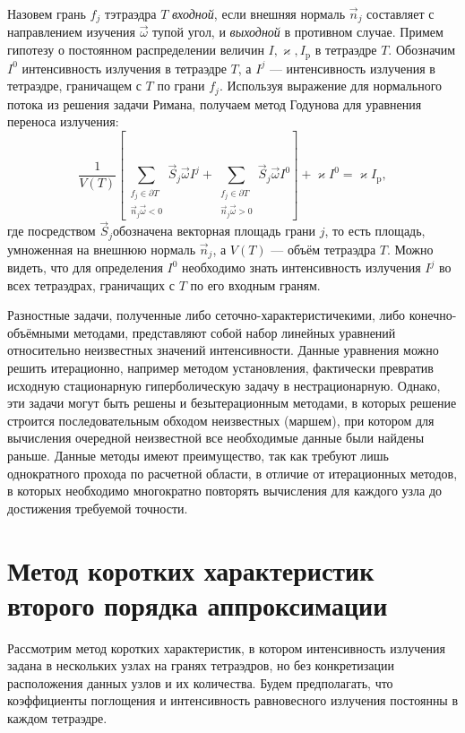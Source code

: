 Назовем грань $f_j$ тэтраэдра $T$ \emph{входной}, если внешняя нормаль $\vec n_j$ составляет с направлением изучения $\vec \omega$ тупой угол, и \emph{выходной} в противном случае.
Примем гипотезу о постоянном распределении величин $I, \varkappa, I_{\text{p}}$ в тетраэдре $T$. Обозначим $I^0$ интенсивность излучения в тетраэдре $T$, а $I^j$ --- интенсивность излучения в тетраэдре, граничащем с $T$ по грани $f_j$. Используя выражение для нормального потока из решения задачи Римана, получаем метод Годунова для уравнения переноса излучения:
\begin{equation}
\frac{1}{V(T)}\left[
\sum_{\substack{f_j \in \partial T\\\vec n_j \vec \omega < 0}} \vec S_j \vec \omega I^j 
+
\sum_{\substack{f_j \in \partial T\\\vec n_j \vec \omega > 0}} \vec S_j \vec \omega I^0
\right]
+ \varkappa I^0 = \varkappa I_\text{p},
\label{eq:fvm}
\end{equation}
где посредством $\vec S_j$обозначена векторная площадь грани $j$, то есть площадь, умноженная на внешнюю нормаль $\vec n_j$, а $V(T)$ --- объём тетраэдра $T$. Можно видеть, что для определения $I^0$ необходимо знать интенсивность излучения $I^j$ во всех тетраэдрах, граничащих с $T$ по его входным граням.

Разностные задачи, полученные либо сеточно-характеристичекими, либо конечно-объёмными методами, представляют собой набор линейных уравнений относительно неизвестных значений интенсивности. Данные уравнения можно решить итерационно, например методом установления, фактически превратив исходную стационарную гиперболическую задачу в нестрационарную. Однако, эти задачи могут быть решены и безытерационным методами, в которых решение строится последовательным обходом неизвестных (маршем), при котором для вычисления очередной неизвестной все необходимые данные были найдены раньше.
Данные методы имеют преимущество, так как требуют лишь однократного прохода по расчетной области, в отличие от итерационных методов, в которых необходимо многократно повторять вычисления для каждого узла до достижения требуемой точности.

\section{Метод коротких характеристик второго порядка аппроксимации}

Рассмотрим метод коротких характеристик, в котором интенсивность излучения задана в нескольких узлах на гранях тетраэдров, но без конкретизации расположения данных узлов и их количества. Будем предполагать, что коэффициенты поглощения и интенсивность равновесного излучения постоянны в каждом тетраэдре.

